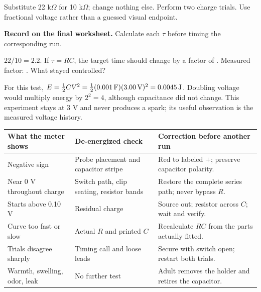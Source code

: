 \newpage
{}
\begingroup\scriptsize
\setlength{\parskip}{.25em}


Substitute 22 k\(\Omega\) for 10 k\(\Omega\); change nothing else. Perform two
charge trials. Use fractional voltage rather than a guessed visual endpoint.

\begin{telosframe}
\textbf{Record on the final worksheet.} Calculate each \(\tau\) before timing
the corresponding run.
\end{telosframe}

\begin{predict}
\(22/10=2.2\). If \(\tau=RC\), the target time should change by a factor of
\writein{1cm}. Measured factor: \writein{1cm}. What stayed controlled?
\writein{5cm}
\end{predict}
\vspace{-5pt}


For this test,
\(E=\tfrac12CV^2=\tfrac12(0.001\,{\rm F})(3.00\,{\rm V})^2=0.0045\,{\rm J}\).
Doubling voltage would multiply energy by \(2^2=4\), although capacitance did
not change. This experiment stays at 3 V and never produces a spark; its useful
observation is the measured voltage history.
\vspace{-4pt}


\begin{tabularx}{\linewidth}{@{}p{.25\linewidth}LL@{}}
\toprule
What the meter shows & De-energized check & Correction before another run\\
\midrule
Negative sign & Probe placement and capacitor stripe & Red to labeled \(+\);
preserve capacitor polarity.\\
Near 0 V throughout charge & Switch path, clip seating, resistor bands &
Restore the complete series path; never bypass \(R\).\\
Starts above 0.10 V & Residual charge & Source out; resistor across \(C\);
wait and verify.\\
Curve too fast or slow & Actual \(R\) and printed \(C\) & Recalculate \(RC\)
from the parts actually fitted.\\
Trials disagree sharply & Timing call and loose leads & Secure with switch open;
restart both trials.\\
Warmth, swelling, odor, leak & No further test & Adult removes the holder and
retires the capacitor.\\
\bottomrule
\end{tabularx}
\vspace{-4pt}

